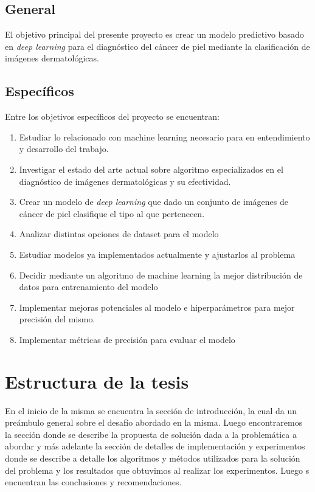 \subsection*{General}

El objetivo principal del presente proyecto es crear un modelo predictivo basado en \textit{deep learning} para el diagnóstico del cáncer de piel mediante la clasificación de imágenes dermatológicas.

\subsection*{Específicos}
Entre los objetivos específicos del proyecto se encuentran:

\begin{enumerate}
    \item Estudiar lo relacionado con machine learning necesario para en entendimiento y desarrollo del trabajo.
    \item Investigar el estado del arte actual sobre algoritmo especializados en el diagnóstico de imágenes dermatológicas y su efectividad.
    \item Crear un modelo de \textit{deep learning} que dado un conjunto de imágenes de cáncer de piel clasifique el tipo al que pertenecen.
        \item Analizar distintas opciones de dataset para el modelo
        \item Estudiar modelos ya implementados actualmente y ajustarlos al problema
        \item Decidir mediante un algoritmo de machine learning la mejor distribución de datos para entrenamiento del modelo
        \item Implementar mejoras potenciales al modelo e hiperparámetros para mejor precisión del mismo.
    \item Implementar métricas de precisión para evaluar el modelo
\end{enumerate}

\section*{Estructura de la tesis}

En el inicio de la misma se encuentra la sección de introducción, la cual da un preámbulo general sobre el desafío abordado en la misma. Luego encontraremos la sección donde se describe la propuesta de solución dada a la problemática a abordar y más adelante la sección de detalles de implementación y experimentos donde se describe a detalle los algoritmos y métodos utilizados para la solución del problema y los resultados que obtuvimos al realizar los experimentos. Luego s encuentran las conclusiones y recomendaciones.
